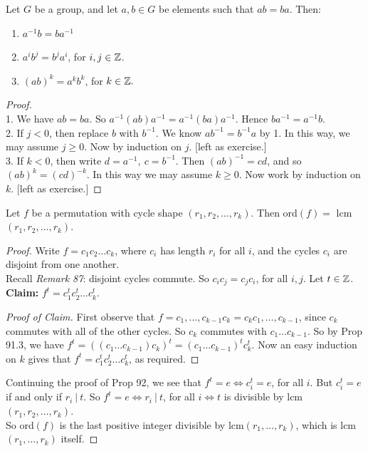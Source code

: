 \begin{proposition}Let $G$ be a group, and let $a,b\in G$ be elements such that $ab = ba$. Then: \begin{enumerate}
 \item $a^{-1}b = ba^{-1}$
 \item $a^ib^j = b^ja^i$, for $i,j \in \mathbb{Z}$.
 \item $(ab)^k = a^kb^k$, for $k \in \mathbb{Z}.$	
 \end{enumerate}
 \end{proposition}
 
 \begin{proof}~\\ 
 
 1. We have $ab = ba.$ So $a^{-1}(ab)a^{-1} = a^{-1}(ba)a^{-1}$. Hence $ba^{-1} =  a^{-1}b$.\\
 
 2. If $j < 0$, then replace $b$ with $b^{-1}$. We know $ab^{-1} = b^{-1}a$ by 1. In this way, we may assume $j \geq 0$. Now by induction on $j$. [left as exercise.]\\
 
 3. If $k < 0$, then write $d = a^{-1},~c = b^{-1}$. Then $(ab)^{-1} = cd$, and so $(ab)^k = (cd)^{-k}$. In this way we may assume $k \geq 0$. Now work by induction on $k$. [left as exercise.]
 \end{proof}\vspace*{10pt}

 
 
\begin{proposition} Let $f$ be a permutation with cycle shape $(r_1,r_2,\dots,r_k)$. Then ord$(f) =$ lcm$(r_1,r_2,\dots,r_k)$.	
\end{proposition}


 \begin{proof} 

Write   $f = c_1c_2\dots c_k$, where $c_i$ has length $r_i$ for all $i$, and the cycles $c_i$ are disjoint from one another.\\

Recall \textit{Remark 87}: disjoint cycles commute. So $c_ic_j = c_jc_i$, for all $i,j$. Let $t \in \mathbb{Z}$. \textbf{Claim:} $f^t = c_1^tc_2^t\dots c_k^t$. 
\begin{proof}[Proof of Claim] First observe that $f = c_1,\dots,c_{k-1}c_k = c_kc_1,\dots,c_{k-1}$, since $c_k$ commutes with all of the other cycles. So $c_k$ commutes with $c_1\dots c_{k-1}$. So by Prop 91.3, we have $f^t = ((c_1\dots c_{k-1})c_k)^t =(c_1\dots c_{k-1})^t  c_k^t $. Now an easy induction on $k$ gives that $f^t = c_1^tc_2^t\dots c_k^t$, as required.
\end{proof}

Continuing the proof of Prop 92, we see that $f^t = e \iff c_i^t = e$, for all $i$. But $c_i^t = e$ if and only if $r_i ~|~ t$. So $f^t = e \iff r_i ~|~ t$, for all $i \iff t$ is divisible by lcm$(r_1,r_2,\dots,r_k)$.\\

So ord$(f)$ is the last positive integer divisible by lcm$(r_1,\dots,r_k)$, which is lcm$(r_1,\dots,r_k)$ itself.
 \end{proof}\vspace*{10pt}
 
